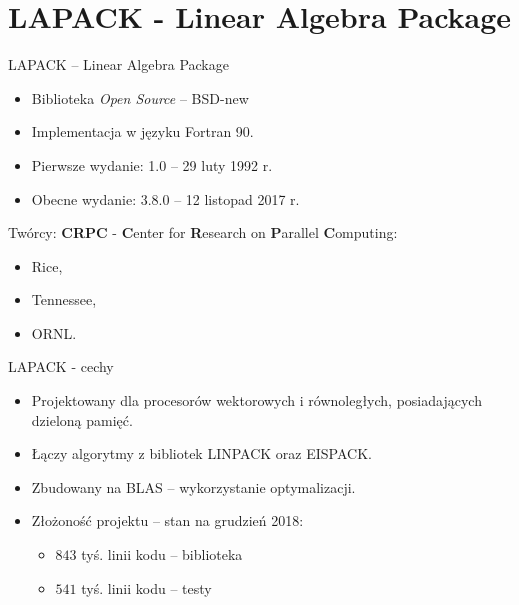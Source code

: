 \section{LAPACK - Linear Algebra Package}
	\begin{frame}{LAPACK -- Linear Algebra Package}
		\begin{itemize}
			\item Biblioteka \textit{Open Source} -- BSD-new
			\item Implementacja w języku Fortran 90.
			\item Pierwsze wydanie: 1.0 -- 29 luty 1992 r.
			\item Obecne wydanie: 3.8.0 -- 12 listopad 2017 r.
		\end{itemize}
		Twórcy:
		\textbf{CRPC} - \textbf{C}enter for \textbf{R}esearch on \textbf{P}arallel \textbf{C}omputing:
		\begin{itemize}
			\item Rice,
			\item Tennessee,
			\item ORNL.
		\end{itemize}
	\end{frame}
	\begin{frame}{LAPACK - cechy}
		\begin{itemize}
			\item Projektowany dla procesorów wektorowych i równoległych, posiadających dzieloną pamięć.
			\item Łączy algorytmy z bibliotek LINPACK oraz EISPACK.
			\item Zbudowany na BLAS -- wykorzystanie optymalizacji.
			\item Złożoność projektu -- stan na grudzień 2018:
			\begin{itemize}
				\item $843$ tyś. linii kodu -- biblioteka
				\item $541$ tyś. linii kodu -- testy
			\end{itemize}
		\end{itemize}
	\end{frame}
